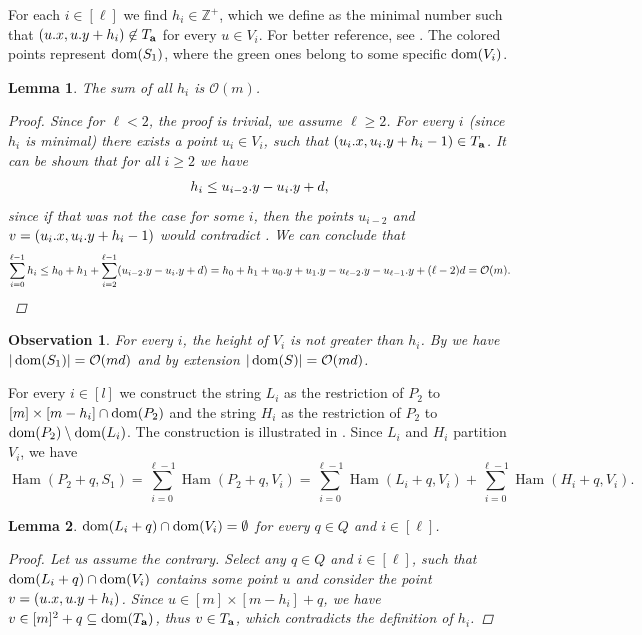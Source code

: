 \documentclass[11pt]{article}
\newcommand{\Z}{\mathbb{Z}}
\renewcommand{\O}{\mathcal{O}}
\theoremstyle{plain}
\newtheorem{lemma}{Lemma}
\newtheorem{observation}{Observation}
\theoremstyle{definition}
\theoremstyle{remark}
\DeclareMathOperator*{\Ham}{Ham}
\begin{document}
For each $i \in [\ell]$ we find $h_i \in \Z^+$, which we define as the minimal number such that $(u.x, u.y + h_i) \not \in T_\mathbf{a}$ for every $u \in V_i$.
For better reference, see .
The colored points represent $\operatorname*{dom}(S_1)$, where the green ones belong to some specific $\operatorname*{dom}(V_i)$.


\begin{lemma}\label{sum_of_h}
	The sum of all $h_i$ is $\O(m)$.
	\begin{proof}
		Since for $\ell < 2$, the proof is trivial, we assume $\ell \ge 2$.
		For every $i$ (since $h_i$ is minimal) there exists a point $u_i \in V_i$, such that $(u_i.x, u_i.y + h_i - 1) \in T_\mathbf{a}$.
		It can be shown that for all $i \ge 2$ we have
		\[ h_{i} \le u_{i - 2}.y - u_{i}.y + d,\]
		since if that was not the case for some $i$, then the points $u_{i - 2}$ and $v = (u_{i}.x, u_{i}.y + h_{i} - 1)$ would contradict .
		We can conclude that
		\[
			\sum_{i = 0}^{\ell - 1} h_i
			\le h_0 + h_1 + \sum_{i = 2}^{\ell - 1} (\y{u_{i - 2}} - \y{u_i} + d)
			= h_0 + h_1 + \y{u_0} + \y{u_1} - \y{u_{\ell - 2}} - \y{u_{\ell - 1}} + (\ell - 2)d 
			= \O(m).
		\]
	\end{proof}
\end{lemma}


\begin{observation}\label{area_bound}
	For every $i$, the height of $V_i$ is not greater than $h_i$.
	By  we have $|\d{S_1}| = \O(md)$ and by extension $|\d{S}| = \O(md)$.
\end{observation}


For every $i \in [l]$ we construct the string $L_i$ as the restriction of $P_2$ to $[m] \times [m - h_i] \cap \operatorname*{dom}(P_2)$
and the string $H_i$ as the restriction of $P_2$ to $\operatorname*{dom}(P_2) \setminus \operatorname*{dom}(L_i)$.
The construction is illustrated in .
Since $L_i$ and $H_i$ partition $V_i$, we have
\[ \Ham(P_2 + q, S_1) = \sum_{i = 0}^{\ell - 1} \Ham(P_2 + q, V_i) = \sum_{i = 0}^{\ell - 1} \Ham(L_i + q, V_i) + \sum_{i = 0}^{\ell - 1} \Ham(H_i + q, V_i). \]

\begin{lemma}\label{pattern_height_reduction}
	$\operatorname*{dom}(L_i + q) \cap \operatorname*{dom}(V_i) = \emptyset$ for every $q \in Q$ and $i \in [\ell]$.
	\begin{proof}
		Let us assume the contrary.
		Select any $q \in Q$ and $i \in [\ell]$, such that $\operatorname*{dom}(L_i + q) \cap \operatorname*{dom}(V_i)$ 
		contains some point $u$ and consider the point $v = (u.x, u.y + h_i)$.
		Since $u \in [m] \times [m - h_i] + q$, we have $v \in [m]^2 + q \subseteq \operatorname*{dom}(T_\mathbf{a})$, thus $v \in T_\mathbf{a}$, which contradicts the definition of $h_i$.
	\end{proof}
\end{lemma}
\end{document}
